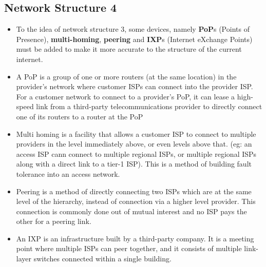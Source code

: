 \documentclass{article}
\theoremstyle{plain}
\theoremstyle{definition}
\begin{document}
\subsection{Network Structure 4}
\begin{itemize}
    \item To the idea of network structure 3, some devices, namely \textbf{PoP}s (Points of Presence), \textbf{multi-homing}, \textbf{peering} and \textbf{IXP}s (Internet eXchange Points) must be added to make it more accurate to the structure of the current internet. 
    
    \item A PoP is a group of one or more routers (at the same location) in the provider’s network where customer ISPs can connect into the provider ISP. For a customer network to connect to a provider’s PoP, it can lease a high-speed link from a third-party telecommunications provider to directly connect one of its routers to a router at the PoP
    
    \item Multi homing is a facility that allows a customer ISP to connect to multiple providers in the level immediately above, or even levels above that. (eg: an access ISP cann connect to multiple regional ISPs, or multiple regional ISPs along with a direct link to a tier-1 ISP). This is a method of building fault tolerance into an access network.
    
    \item Peering is a method of directly connecting two ISPs which are at the same level of the hierarchy, instead of connection via a higher level provider. This connection is commonly done out of mutual interest and no ISP pays the other for a peering link. 
    
    \item An IXP is an infrastructure built by a third-party company. It is a meeting point where multiple ISPs can peer together, and it consists of multiple link-layer switches connected within a single building. 
\end{itemize}
\end{document}
